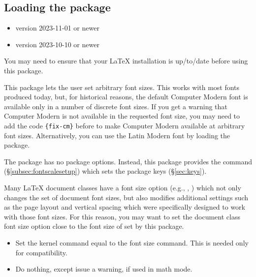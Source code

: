 \documentclass{beery}
\begin{document}
\subsection{Loading the package}
\label{subsec:loading}

\begin{itemize}
  \item \LaTeXe{} version 2023-11-01 or newer
  \item {} version 2023-10-10 or newer
\end{itemize}

You may need to ensure that your \LaTeX{} installation is up\-/to\-/date before using this package.

This package lets the user set arbitrary font sizes.
This works with most fonts produced today, but, for historical reasons, the default Computer Modern font is available only in a number of discrete font sizes.
If you get a warning that Computer Modern is not available in the requested font size, you may need to add the code \allowbreak\verb|{fix-cm}| before  to make Computer Modern available at arbitrary font sizes.
Alternatively, you can use the Latin Modern font by loading the  package.

The  package has no package options.
Instead, this package provides the command  (\S\ref{subsec:fontscalesetup}) which sets the package keys (\S\ref{sec:keys}).

Many \LaTeX{} document classes have a font size option (e.g.\@ \Key{10pt}, \Key{11pt}, \Key{12pt}) which not only changes the set of document font sizes, but also modifies additional settings such as the page layout and vertical spacing which were specifically designed to work with those font sizes.
For this reason, you may want to set the document class font size option close to the font size of  set by this package.

\begin{itemize}
  \item
  Set the kernel command  equal to the font size command.
  This is needed only for compatibility.
  \item
  Do nothing, except issue a warning, if used in math mode.
\end{itemize}
\end{document}
